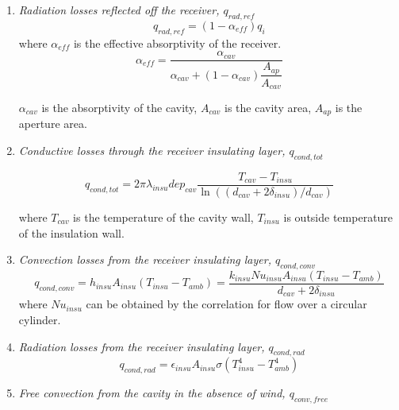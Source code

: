 \begin{enumerate}
  \item \emph{Radiation losses reflected off the receiver, $q_{rad,ref}$}
  \begin{equation}
    q_{rad,ref}=(1-\alpha_{eff})q_{i}
\end{equation}
    where $\alpha_{eff}$ is the effective absorptivity of the receiver.    
    \begin{equation}
    \alpha_{eff}=\frac{\alpha_{cav}}{\alpha_{cav}+(1-\alpha_{cav})\dfrac{A_{ap}}{A_{cav}}}
    \end{equation}
    
    $\alpha_{cav}$ is the absorptivity of the cavity, $A_{cav}$ is the cavity area, $A_{ap}$ is the aperture area.
  \item \emph{Conductive losses through the receiver insulating layer, $q_{cond,tot}$}
  
  \begin{equation}
q_{cond,tot}=2\pi\lambda_{insu}dep_{cav}\dfrac{T_{cav}-T_{insu}}{\ln((d_{cav}+2\delta_{insu})/d_{cav})}
    \end{equation}
    
    where $T_{cav}$ is the temperature of the cavity wall, $T_{insu}$
is outside temperature of the insulation wall.

  \item \emph{Convection losses from the receiver insulating layer, $q_{cond,conv}$}  
  \begin{equation}
	q_{cond,conv}=h_{insu}A_{insu}(T_{insu}-T_{amb})
	=\dfrac{k_{insu}Nu_{insu}A_{insu}(T_{insu}-T_{amb})}{d_{cav}+2\delta_{insu}}
\end{equation}
where $Nu_{insu}$ can be obtained by the correlation for flow over a circular cylinder.~\cite{Churchill1977}

  \item \emph{Radiation losses from the receiver insulating layer, $q_{cond,rad}$}  
  \begin{equation}
	q_{cond,rad}=\epsilon_{insu}A_{insu}\sigma(T_{insu}^4 - T_{amb}^4)
\end{equation}
  \item \emph{Free convection from the cavity in the absence of wind, $q_{conv,free}$}
    

\end{enumerate}
